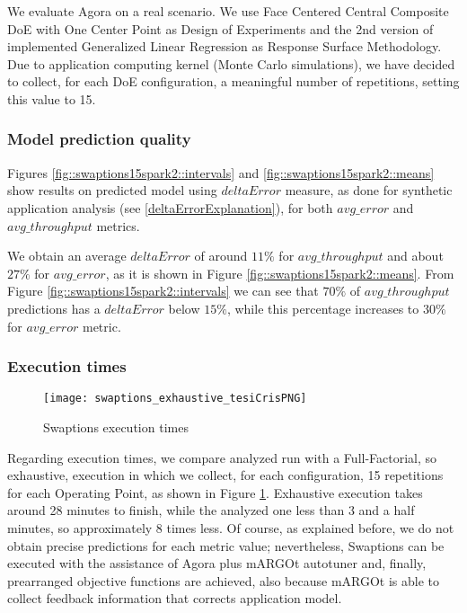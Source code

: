 We evaluate Agora on a real scenario. We use Face Centered Central Composite DoE with One Center Point as Design of Experiments and the 2nd version of implemented Generalized Linear Regression as Response Surface Methodology. Due to application computing kernel (Monte Carlo simulations), we have decided to collect, for each DoE configuration, a meaningful number of repetitions, setting this value to 15.


\subsubsection{Model prediction quality}

Figures \ref{fig::swaptions15spark2::intervals} and \ref{fig::swaptions15spark2::means} show results on predicted model using $deltaError$ measure, as done for synthetic application analysis (see \ref{deltaErrorExplanation}), for both $avg\_error$ and $avg\_throughput$ metrics.

We obtain an average $deltaError$ of around $11\%$ for $avg\_throughput$ and about $27\%$ for $avg\_error$, as it is shown in Figure \ref{fig::swaptions15spark2::means}. From Figure \ref{fig::swaptions15spark2::intervals} we can see that $70\%$ of $avg\_throughput$ predictions has a $deltaError$ below $15\%$, while this percentage increases to $30\%$ for $avg\_error$ metric.


\subsubsection{Execution times}

\begin{figure}[htb]

    \centering
    
    \texttt{[image: swaptions\_exhaustive\_tesiCrisPNG]}
    
    \caption{Swaptions execution times}
    
    \label{fig::sw::execT}
    
\end{figure}

Regarding execution times, we compare analyzed run with a Full-Factorial, so exhaustive, execution in which we collect, for each configuration, 15 repetitions for each Operating Point, as shown in Figure \ref{fig::sw::execT}. Exhaustive execution takes around 28 minutes to finish, while the analyzed one less than 3 and a half minutes, so approximately 8 times less. Of course, as explained before, we do not obtain precise predictions for each metric value; nevertheless, Swaptions can be executed with the assistance of Agora plus mARGOt autotuner and, finally, prearranged objective functions are achieved, also because mARGOt is able to collect feedback information that corrects application model.


